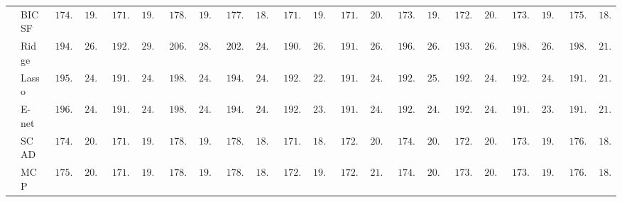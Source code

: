 \begin{tabular}{p{0.2cm}p{1cm}|p{0.6cm}p{0.6cm}|p{0.6cm}p{0.6cm}p{0.6cm}p{0.6cm}p{0.6cm}p{0.6cm}|p{0.6cm}p{0.6cm}p{0.6cm}p{0.6cm}p{0.6cm}p{0.6cm}|p{0.6cm}p{0.6cm}p{0.6cm}p{0.6cm}p{0.6cm}p{0.6cm}}
 & BIC SF  & $\phantom{0}174.52$ & $\phantom{0}19.76$ & $\phantom{0}171.41$ & $\phantom{0}19.43$ & $\phantom{0}178.00$ & $\phantom{0}19.90$ & $\phantom{0}177.50$ & $\phantom{0}18.52$ & $\phantom{0}171.19$ & $\phantom{0}19.00$ & $\phantom{0}171.84$ & $\phantom{0}20.57$ & $\phantom{0}173.79$ & $\phantom{0}19.88$ & $\phantom{0}172.66$ & $\phantom{0}20.32$ & $\phantom{0}173.35$ & $\phantom{0}19.49$ & $\phantom{0}175.41$ & $\phantom{0}18.00$ \\
 & Ridge  & $\phantom{0}194.20$ & $\phantom{0}26.13$ & $\phantom{0}192.95$ & $\phantom{0}29.05$ & $\phantom{0}206.23$ & $\phantom{0}28.25$ & $\phantom{0}202.09$ & $\phantom{0}24.44$ & $\phantom{0}190.80$ & $\phantom{0}26.24$ & $\phantom{0}191.40$ & $\phantom{0}26.77$ & $\phantom{0}196.86$ & $\phantom{0}26.02$ & $\phantom{0}193.55$ & $\phantom{0}26.57$ & $\phantom{0}198.22$ & $\phantom{0}26.92$ & $\phantom{0}198.40$ & $\phantom{0}21.96$ \\
 & Lasso  & $\phantom{0}195.92$ & $\phantom{0}24.46$ & $\phantom{0}191.32$ & $\phantom{0}24.59$ & $\phantom{0}198.40$ & $\phantom{0}24.14$ & $\phantom{0}194.86$ & $\phantom{0}24.18$ & $\phantom{0}192.12$ & $\phantom{0}22.78$ & $\phantom{0}191.41$ & $\phantom{0}24.67$ & $\phantom{0}192.13$ & $\phantom{0}25.03$ & $\phantom{0}192.91$ & $\phantom{0}24.56$ & $\phantom{0}192.16$ & $\phantom{0}24.09$ & $\phantom{0}191.98$ & $\phantom{0}21.34$ \\
 & E-net  & $\phantom{0}196.19$ & $\phantom{0}24.72$ & $\phantom{0}191.27$ & $\phantom{0}24.82$ & $\phantom{0}198.14$ & $\phantom{0}24.16$ & $\phantom{0}194.25$ & $\phantom{0}24.06$ & $\phantom{0}192.41$ & $\phantom{0}23.00$ & $\phantom{0}191.36$ & $\phantom{0}24.51$ & $\phantom{0}192.22$ & $\phantom{0}24.81$ & $\phantom{0}192.82$ & $\phantom{0}24.61$ & $\phantom{0}191.74$ & $\phantom{0}23.89$ & $\phantom{0}191.87$ & $\phantom{0}21.52$ \\
 & SCAD  & $\phantom{0}174.90$ & $\phantom{0}20.36$ & $\phantom{0}171.31$ & $\phantom{0}19.50$ & $\phantom{0}178.56$ & $\phantom{0}19.75$ & $\phantom{0}178.86$ & $\phantom{0}18.95$ & $\phantom{0}171.50$ & $\phantom{0}18.95$ & $\phantom{0}172.26$ & $\phantom{0}20.93$ & $\phantom{0}174.22$ & $\phantom{0}20.30$ & $\phantom{0}172.90$ & $\phantom{0}20.36$ & $\phantom{0}173.39$ & $\phantom{0}19.46$ & $\phantom{0}176.21$ & $\phantom{0}18.27$ \\
 & MCP  & $\phantom{0}175.80$ & $\phantom{0}20.58$ & $\phantom{0}171.89$ & $\phantom{0}19.34$ & $\phantom{0}178.81$ & $\phantom{0}19.77$ & $\phantom{0}178.79$ & $\phantom{0}18.90$ & $\phantom{0}172.11$ & $\phantom{0}19.09$ & $\phantom{0}172.98$ & $\phantom{0}21.06$ & $\phantom{0}174.31$ & $\phantom{0}20.19$ & $\phantom{0}173.51$ & $\phantom{0}20.49$ & $\phantom{0}173.74$ & $\phantom{0}19.60$ & $\phantom{0}176.23$ & $\phantom{0}18.25$ \\

\end{tabular}
